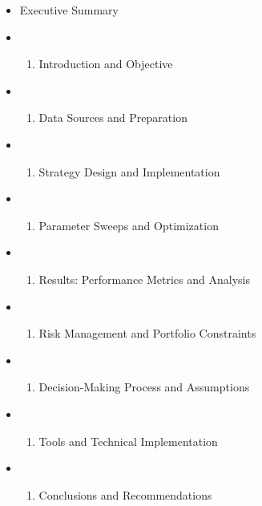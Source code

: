 \documentclass[11pt]{article}
\providecommand{\tightlist}{%
      \setlength{\itemsep}{0pt}\setlength{\parskip}{0pt}}
\begin{document}
\begin{itemize}
\tightlist
\item
  Executive Summary
\item
  \begin{enumerate}
  \def\labelenumi{\arabic{enumi}.}
  \tightlist
  \item
    Introduction and Objective
  \end{enumerate}
\item
  \begin{enumerate}
  \def\labelenumi{\arabic{enumi}.}
  \setcounter{enumi}{1}
  \tightlist
  \item
    Data Sources and Preparation
  \end{enumerate}
\item
  \begin{enumerate}
  \def\labelenumi{\arabic{enumi}.}
  \setcounter{enumi}{2}
  \tightlist
  \item
    Strategy Design and Implementation
  \end{enumerate}
\item
  \begin{enumerate}
  \def\labelenumi{\arabic{enumi}.}
  \setcounter{enumi}{3}
  \tightlist
  \item
    Parameter Sweeps and Optimization
  \end{enumerate}
\item
  \begin{enumerate}
  \def\labelenumi{\arabic{enumi}.}
  \setcounter{enumi}{4}
  \tightlist
  \item
    Results: Performance Metrics and Analysis
  \end{enumerate}
\item
  \begin{enumerate}
  \def\labelenumi{\arabic{enumi}.}
  \setcounter{enumi}{5}
  \tightlist
  \item
    Risk Management and Portfolio Constraints
  \end{enumerate}
\item
  \begin{enumerate}
  \def\labelenumi{\arabic{enumi}.}
  \setcounter{enumi}{6}
  \tightlist
  \item
    Decision-Making Process and Assumptions
  \end{enumerate}
\item
  \begin{enumerate}
  \def\labelenumi{\arabic{enumi}.}
  \setcounter{enumi}{7}
  \tightlist
  \item
    Tools and Technical Implementation
  \end{enumerate}
\item
  \begin{enumerate}
  \def\labelenumi{\arabic{enumi}.}
  \setcounter{enumi}{8}
  \tightlist
  \item
    Conclusions and Recommendations
  \end{enumerate}
\end{itemize}
\end{document}
